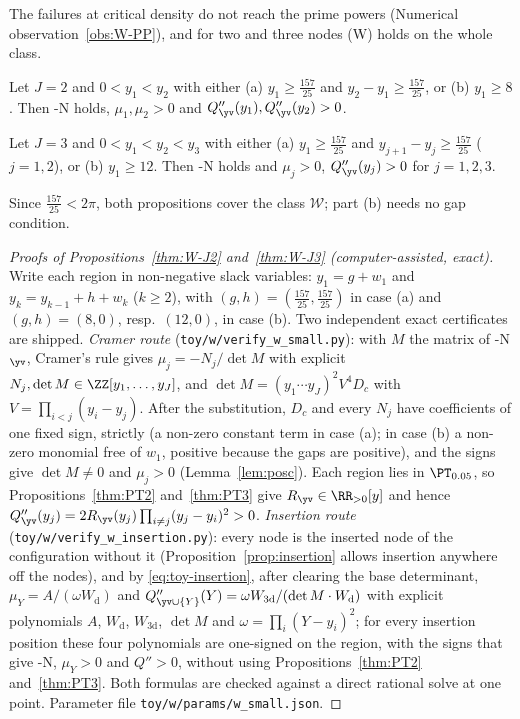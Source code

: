 The failures at critical density do not reach the prime powers (Numerical observation~\ref{obs:W-PP}), and for two and
three nodes (W) holds on the whole class.

\begin{proposition}\label{thm:W-J2}
Let $J=2$ and $0<y_1<y_2$ with either \textup{(a)} $y_1\ge\frac{157}{25}$ and $y_2-y_1\ge\frac{157}{25}$, or
\textup{(b)} $y_1\ge8$. Then \hyp{N} holds, $\mu_1,\mu_2>0$ and $Q''_{\yv}(y_1),Q''_{\yv}(y_2)>0$.
\end{proposition}

\begin{proposition}\label{thm:W-J3}
Let $J=3$ and $0<y_1<y_2<y_3$ with either \textup{(a)} $y_1\ge\frac{157}{25}$ and $y_{j+1}-y_j\ge\frac{157}{25}$
\textup{(}$j=1,2$\textup{)}, or \textup{(b)} $y_1\ge12$. Then \hyp{N} holds and $\mu_j>0$, $Q''_{\yv}(y_j)>0$ for
$j=1,2,3$.
\end{proposition}

Since $\frac{157}{25}<2\pi$, both propositions cover the class $\mathcal W$; part (b) needs no gap condition.

\begin{proof}[Proofs of Propositions~\ref{thm:W-J2} and~\ref{thm:W-J3} \textup{(computer-assisted, exact)}]
Write each region in non-negative slack variables: $y_1=g+w_1$ and $y_k=y_{k-1}+h+w_k$ ($k\ge2$), with
$(g,h)=(\frac{157}{25},\frac{157}{25})$ in case (a) and $(g,h)=(8,0)$, resp.\ $(12,0)$, in case (b). Two independent exact
certificates are shipped. \emph{Cramer route} (\nolinkurl{toy/w/verify_w_small.py}): with $M$ the matrix of \hyp{N}$_{\yv}$,
Cramer's rule gives $\mu_j=-N_j/\det M$ with explicit $N_j,\det M\in\ZZ[y_1,\dots,y_J]$, and
$\det M=(y_1\cdots y_J)^2V^4D_c$ with $V=\prod_{i<j}(y_i-y_j)$. After the substitution, $D_c$ and every $N_j$ have
coefficients of one fixed sign, strictly (a non-zero constant term in case (a); in case (b) a non-zero monomial free of $w_1$,
positive because the gaps are positive), and the signs give $\det M\ne0$ and $\mu_j>0$ (Lemma~\ref{lem:posc}). Each region lies
in $\PT_{0.05}$, so Propositions~\ref{thm:PT2} and~\ref{thm:PT3} give $R_{\yv}\in\RR_{>0}[y]$ and hence
$Q''_{\yv}(y_j)=2R_{\yv}(y_j)\prod_{i\ne j}(y_j-y_i)^2>0$. \emph{Insertion route} (\nolinkurl{toy/w/verify_w_insertion.py}):
every node is the inserted node of the configuration without it (Proposition~\ref{prop:insertion} allows insertion
anywhere off the nodes), and by \eqref{eq:toy-insertion}, after clearing the base determinant,
$\mu_Y=A/(\omega W_{\mathrm d})$ and $Q''_{\yv\cup\{Y\}}(Y)=\omega W_{3\mathrm d}/(\det M\cdot W_{\mathrm d})$ with explicit
polynomials $A$, $W_{\mathrm d}$, $W_{3\mathrm d}$, $\det M$ and $\omega=\prod_i(Y-y_i)^2$; for every insertion position these
four polynomials are one-signed on the region, with the signs that give \hyp{N}, $\mu_Y>0$ and $Q''>0$, without using
Propositions~\ref{thm:PT2} and~\ref{thm:PT3}. Both formulas are checked against a direct rational solve at one point.
Parameter file \nolinkurl{toy/w/params/w_small.json}.
\end{proof}

